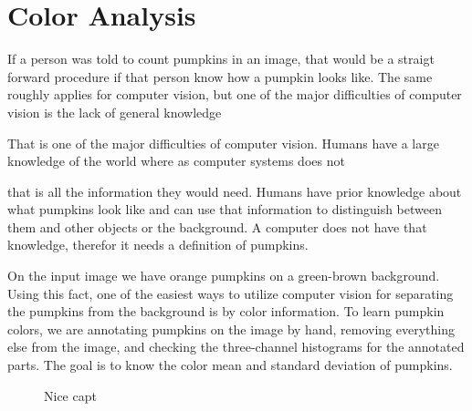 \documentclass[../Head/Main.tex]{subfiles}
\begin{document}
\section{Color Analysis}

If a person was told to count pumpkins in an image, that would be a straigt forward procedure if that person know how a pumpkin looks like. 
The same roughly applies for computer vision, but one of the major difficulties of computer vision is the lack of general knowledge


That is one of the major difficulties of computer vision. Humans have a large knowledge of the world where as computer systems does not


that is all the information they would need.
Humans have prior knowledge about what pumpkins look like and can use that information to distinguish between them and other objects or the background.
A computer does not have that knowledge, therefor it needs a definition of pumpkins.

On the input image we have orange pumpkins on a green-brown background.
Using this fact, one of the easiest ways to utilize computer vision for separating the pumpkins from the background is by color information.
To learn pumpkin colors, we are annotating pumpkins on the image by hand, removing everything else from the image, and checking the three-channel histograms for the annotated parts.
The goal is to know the color mean and standard deviation of pumpkins.

\begin{figure}[H]
	\centering
	\scalebox{0.9}{
	}
	\caption{Nice capt}
	\label{fig:color_mean}
\end{figure}
\end{document}
